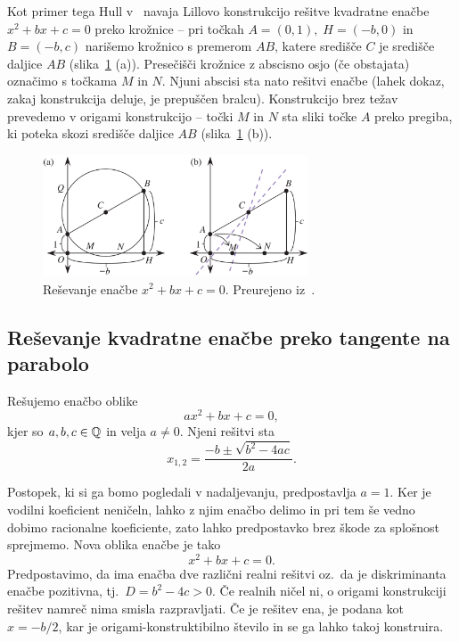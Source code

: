 Kot primer tega Hull v~\cite[str.\ 38]{hull2020} navaja Lillovo konstrukcijo rešitve kvadratne enačbe $x^2 + bx + c = 0$ preko krožnice -- pri točkah $A = (0,1), \; H = (-b, 0)$ in $B = (-b, c)$ narišemo krožnico s premerom $AB$, katere središče $C$ je središče daljice $AB$ (slika~\ref{fig:par_primer_hull_lill} (a)). Presečišči krožnice z abscisno osjo (če obstajata) označimo s točkama $M$ in $N$. Njuni abscisi sta nato rešitvi enačbe (lahek dokaz, zakaj konstrukcija deluje, je prepuščen bralcu). Konstrukcijo brez težav prevedemo v origami konstrukcijo -- točki $M$ in $N$ sta sliki točke $A$ preko pregiba, ki poteka skozi središče daljice $AB$ (slika~\ref{fig:par_primer_hull_lill} (b)).

\begin{figure}[h]
    \centering
    \includegraphics[width=0.7\textwidth]{images/kvadratna_enacba/primer_hull_lill.png}
    \caption[Primer reševanja kvadratne enačbe z evklidskim orodjem]{Reševanje enačbe $x^2 + bx + c = 0$. Preurejeno iz~\cite[str.\ 38]{hull2020}.}
    \label{fig:par_primer_hull_lill}
\end{figure}

\subsection{Reševanje kvadratne enačbe preko tangente na parabolo}
\label{podpogl:kvadratna_enacba}

Rešujemo enačbo oblike
$$ a x^2 + b x + c = 0, $$
kjer so $a, b, c \in \mathbb Q$ in velja $a \neq 0$.  Njeni rešitvi sta
$$ x_{1,2} = \frac{-b \pm \sqrt{b^2 - 4ac}}{2a}.$$

Postopek, ki si ga bomo pogledali v nadaljevanju, predpostavlja $a = 1$. Ker je vodilni koeficient neničeln, lahko z njim enačbo delimo in pri tem še vedno dobimo racionalne koeficiente, zato lahko predpostavko brez škode za splošnost sprejmemo. Nova oblika enačbe je tako
\begin{equation}
    \label{eq:spl_kv_en}
    x^2 + bx + c = 0.
\end{equation}
Predpostavimo, da ima enačba dve različni realni rešitvi oz.\ da je diskriminanta enačbe pozitivna, tj.\ $D = b^2 - 4c > 0$. Če realnih ničel ni, o origami konstrukciji rešitev namreč nima smisla razpravljati. Če je rešitev ena, je podana kot $x = -b/2$, kar je origami-konstruktibilno število in se ga lahko takoj konstruira.

